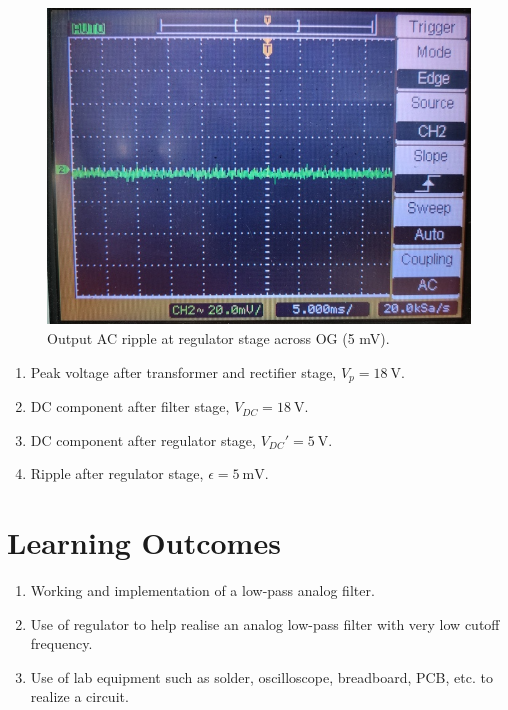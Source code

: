 \documentclass[journal,12pt,twocolumn]{IEEEtran}
\begin{document}
\begin{figure}[!ht]
	\includegraphics[width=\columnwidth]{figs/regulator_ac.jpg}
	\caption{Output AC ripple at regulator stage across OG (5 mV).}
	\label{fig:regulator_ac}
\end{figure}

\begin{enumerate}
	\item Peak voltage after transformer and rectifier stage, 
	$V_p = \SI[parse-numbers=false]{18}{\V}$.
	\item DC component after filter stage, 
	$V_{DC} = \SI[parse-numbers=false]{18}{\V}$.
	\item DC component after regulator stage, $V_{DC}' = \SI{5}{\V}$.
	\item Ripple after regulator stage, $\epsilon = \SI{5}{\milli\V}$.
\end{enumerate}

\section{Learning Outcomes}
\begin{enumerate}
	\item Working and implementation of a low-pass analog filter.
	\item Use of regulator to help realise an analog low-pass filter with
	very low cutoff frequency.
	\item Use of lab equipment such as solder, oscilloscope, breadboard, PCB, etc.
	to realize a circuit.
\end{enumerate}
\end{document}

